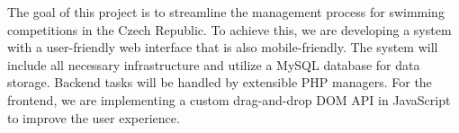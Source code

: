 \documentclass[12pt]{report}
\begin{document}

The goal of this project is to streamline the management process for swimming competitions in the Czech Republic. To achieve this, we are developing a system with a user-friendly web interface that is also mobile-friendly. The system will include all necessary infrastructure and utilize a MySQL database for data storage. Backend tasks will be handled by extensible PHP managers. For the frontend, we are implementing a custom drag-and-drop DOM API in JavaScript to improve the user experience.
\end{document}
